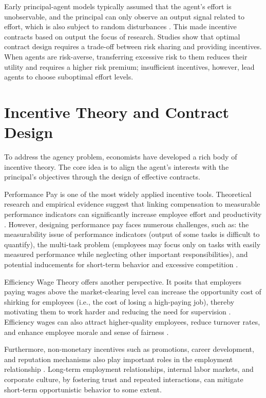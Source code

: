 Early principal-agent models typically assumed that the agent's effort is unobservable, and the principal can only observe an output signal related to effort, which is also subject to random disturbances \citep{holmstrom1979moral, grossman1983analysis}. This made incentive contracts based on output the focus of research. Studies show that optimal contract design requires a trade-off between risk sharing and providing incentives. When agents are risk-averse, transferring excessive risk to them reduces their utility and requires a higher risk premium; insufficient incentives, however, lead agents to choose suboptimal effort levels.

\section{Incentive Theory and Contract Design}

To address the agency problem, economists have developed a rich body of incentive theory. The core idea is to align the agent's interests with the principal's objectives through the design of effective contracts.

Performance Pay is one of the most widely applied incentive tools. Theoretical research and empirical evidence suggest that linking compensation to measurable performance indicators can significantly increase employee effort and productivity \citep{lazear1999performance}. However, designing performance pay faces numerous challenges, such as: the measurability issue of performance indicators (output of some tasks is difficult to quantify), the multi-task problem (employees may focus only on tasks with easily measured performance while neglecting other important responsibilities), and potential inducements for short-term behavior and excessive competition \citep{holmstrom1991multitask}.

Efficiency Wage Theory offers another perspective. It posits that employers paying wages above the market-clearing level can increase the opportunity cost of shirking for employees (i.e., the cost of losing a high-paying job), thereby motivating them to work harder and reducing the need for supervision \citep{shapiro1984equilibrium}. Efficiency wages can also attract higher-quality employees, reduce turnover rates, and enhance employee morale and sense of fairness \citep{akerlof1986efficiency}.

Furthermore, non-monetary incentives such as promotions, career development, and reputation mechanisms also play important roles in the employment relationship \citep{fama1980agency, gibbons1999careers}. Long-term employment relationships, internal labor markets, and corporate culture, by fostering trust and repeated interactions, can mitigate short-term opportunistic behavior to some extent.

